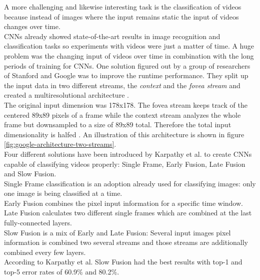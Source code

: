 \documentclass[12pt,twoside]{article}
\theoremstyle{plain}
\theoremstyle{definition}
\theoremstyle{remark}
\begin{document}
A more challenging and likewise interesting task is the classification of videos because instead of images where the input remains static the input of videos changes over time.
\\
CNNs already showed state-of-the-art results in image recognition and classification tasks so experiments with videos were just a matter of time. A huge problem was the changing input of videos over time in combination with the long periods of training for CNNs. One solution figured out by a group of researchers of Stanford and Google was to improve the runtime performance. They split up the input data in two different streams, the \textit{context} and the \textit{fovea stream} and created a multiresolutional architecture \cite{GoogleLargeScaleVideoClassification-Karpathy}.
\\
The original input dimension was 178x178. The fovea stream keeps track of the centered 89x89 pixels of a frame while the context stream analyzes the whole frame but downsampled to a size of 89x89 total. Therefore the total input dimensionality is halfed \cite{GoogleLargeScaleVideoClassification-Karpathy}. An illustration of this architecture is shown in figure \ref{fig:google-architecture-two-streams}.
\\
Four different solutions have been introduced by Karpathy et al. to create CNNs capable of classifying videos properly: Single Frame, Early Fusion, Late Fusion and Slow Fusion.
\\
Single Frame classification is an adoption already used for classifying images: only one image is being classified at a time.
\\
Early Fusion combines the pixel input information for a specific time window.
\\
Late Fusion calculates two different single frames which are combined at the last fully-connected layers.
\\
Slow Fusion is a mix of Early and Late Fusion: Several input images pixel information is combined two several streams and those streams are additionally combined every few layers.
\\
According to Karpathy et al. \cite{GoogleLargeScaleVideoClassification-Karpathy} Slow Fusion had the best results with top-1 and top-5 error rates of 60.9\% and 80.2\%.
\end{document}

